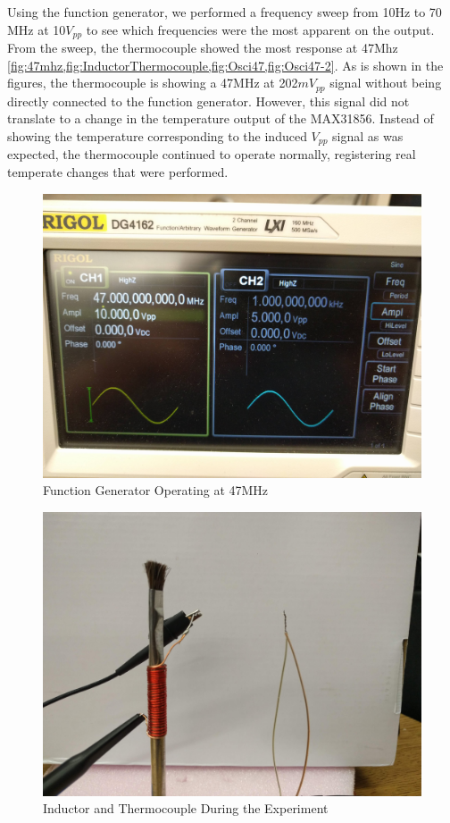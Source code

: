 Using the function generator, we performed a frequency sweep from 10Hz to 70 MHz at 10$V_{pp}$ to see which frequencies were the most apparent on the output. From the sweep, the thermocouple showed the most response at 47Mhz \cref{fig:47mhz,fig:InductorThermocouple,fig:Osci47,fig:Osci47-2}. As is shown in the figures, the thermocouple is showing a 47MHz at 202$mV_{pp}$ signal without being directly connected to the function generator. However, this signal did not translate to a change in the temperature output of the MAX31856. Instead of showing the temperature corresponding to the induced $V_{pp}$ signal as was expected, the thermocouple continued to operate normally, registering real temperate changes that were performed.

\begin{figure}
    \centering
    \includegraphics[width=\linewidth]{pictures/47Mhz.jpg}
    \caption{Function Generator Operating at 47MHz}
    \label{fig:47mhz}
\end{figure}
\begin{figure}
    \centering
    \includegraphics[width=\linewidth]{pictures/Inductor+TCouple.jpg}
    \caption{Inductor and Thermocouple During the Experiment}
    \label{fig:InductorThermocouple}
\end{figure}
